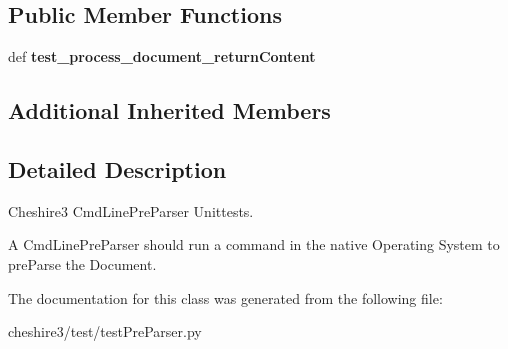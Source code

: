 \subsection*{Public Member Functions}
\begin{DoxyCompactItemize}
\item 
\hypertarget{classcheshire3_1_1test_1_1test_pre_parser_1_1_cmd_line_pre_parser_test_case_aaf9f15ea3bec7f64dc9304afc2457ab6}{def {\bfseries test\-\_\-process\-\_\-document\-\_\-return\-Content}}\label{classcheshire3_1_1test_1_1test_pre_parser_1_1_cmd_line_pre_parser_test_case_aaf9f15ea3bec7f64dc9304afc2457ab6}

\end{DoxyCompactItemize}
\subsection*{Additional Inherited Members}


\subsection{Detailed Description}
\begin{DoxyVerb}Cheshire3 CmdLinePreParser Unittests.

A CmdLinePreParser should run a command in the native Operating System to
preParse the Document.
\end{DoxyVerb}
 

The documentation for this class was generated from the following file\-:\begin{DoxyCompactItemize}
\item 
cheshire3/test/test\-Pre\-Parser.\-py\end{DoxyCompactItemize}
